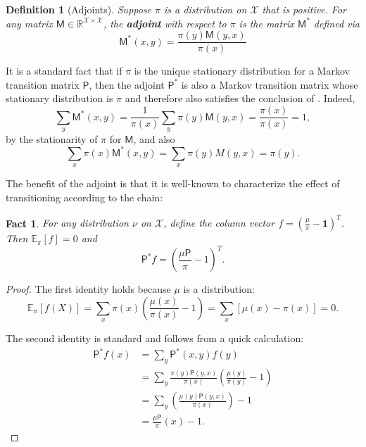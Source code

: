 \documentclass[11pt]{article}
\newtheorem{defn}[thm]{Definition}
\newtheorem{fact}[thm]{Fact}
\theoremstyle{remark}
\begin{document}
\begin{defn}[Adjoints]
    Suppose $\pi$ is a distribution on $\mathcal{X}$ that is positive. For any matrix $\mathsf{M}\in \mathbb{R}^{\mathcal{X}\times \mathcal{X}}$, the \textbf{adjoint} with respect to $\pi$ is the matrix $\mathsf{M}^*$ defined via
    \begin{equation*}
        \mathsf{M}^*(x,y) = \frac{\pi(y)\mathsf{M}(y,x)}{\pi(x)}
    \end{equation*}
\end{defn}

It is a standard fact that if $\pi$ is the unique stationary distribution for a Markov transition matrix $\mathsf{P}$, then the adjoint $\mathsf{P}^*$ is also a Markov transition matrix whose stationary distribution is $\pi$ and therefore also satisfies the conclusion of . Indeed,
\begin{equation*}
    \sum_{y} \mathsf{M}^*(x,y) = \frac{1}{\pi(x)}\sum_{y} \pi(y)\mathsf{M}(y,x) = \frac{\pi(x)}{\pi(x)} = 1,
\end{equation*}
by the stationarity of $\pi$ for $\mathsf{M}$, and also
\begin{equation*}
    \sum_{x}\pi(x)\mathsf{M}^*(x,y) = \sum_{x} \pi(y)M(y,x) = \pi(y).
\end{equation*}

The benefit of the adjoint is that it is well-known to characterize the effect of transitioning according to the chain:
\begin{fact}
\label{fact:adj_dist}
    For any distribution $\nu$ on $\mathcal{X}$, define the column vector $f=(\frac{\mu}{\pi}-\bm{1})^T$. Then $\mathbb{E}_{\pi}[f]=0$ and 
    \begin{equation*}
        \mathsf{P}^*f = \left(\frac{\mu\mathsf{P}}{\pi}-1\right)^T.
    \end{equation*}
\end{fact}
\begin{proof}
    The first identity holds because $\mu$ is a distribution:
    \begin{equation*}
        \mathbb{E}_{\pi}[f(X)] = \sum_{x}\pi(x)\left(\frac{\mu(x)}{\pi(x)}-1\right)=\sum_{x}[\mu(x)-\pi(x)] = 0.
    \end{equation*}

    The second identity is standard and follows from a quick calculation:
    \begin{align*}
        \mathsf{P}^*f(x) &= \sum_{y}\mathsf{P}^*(x,y)f(y)\\
        &=\sum_{y}\frac{\pi(y)\mathsf{P}(y,x)}{\pi(x)}\left(\frac{\mu(y)}{\pi(y)}-1\right)\\
        &=\sum_{y}\left(\frac{\mu(y)\mathsf{P}(y,x)}{\pi(x)}\right) -1\\
        &=\frac{\mu \mathsf{P}}{\pi}(x) - 1.
    \end{align*}
    
\end{proof}
\end{document}

